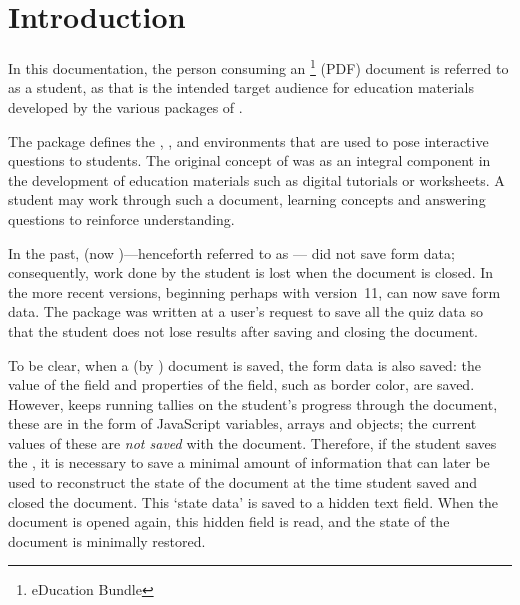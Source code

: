 \documentclass{article}
\makeatletter
\def\hisher{\@ifstar{\hisheri}{\global\advance\hesheCnt1\relax\hisheri}}
\def\hisheri{\ifodd\hesheCnt her\else his\fi}
\makeatother
\begin{document}
\maketitle

\tableofcontents
{}

\section{Introduction}

In this documentation, the person consuming an \AEB\footnote{{\AcroTeX}
eDucation Bundle} (PDF) document is referred to as a student, as that is the
intended target audience for education materials developed by the various
packages of \AEB.

The  package defines the , , and
 environments that are used to pose interactive questions to
students. The original concept of  was as an integral component
in the development of education materials such as digital tutorials or
worksheets. A student may work through such a document, learning concepts and
answering questions to reinforce {\hisher} understanding.

In the past,  (now )---henceforth
referred to as --- did not save form data; consequently, work done by
the student is lost when the document is closed. In the more recent versions,
beginning perhaps with version~11,  can now save form data. The
 package was written at a user's request to save all the quiz
data so that the student does not lose {\hisher} results after saving and
closing the document.

To be clear, when a {\PDF} (by ) document is saved, the form data is
also saved: the value of the field and properties of the field, such as
border color, are saved. However,  keeps running tallies on the
student's progress through the document, these are in the form of JavaScript
variables, arrays and objects; the current values of these are \emph{not
saved} with the document. Therefore, if the student saves the \PDF, it is
necessary to save a minimal amount of information that can later be used to
reconstruct the state of the document at the time student saved and closed the
document. This `state data' is saved to a hidden text field. When the
document is opened again, this hidden field is read, and the state of the
document is minimally restored.
\end{document}
